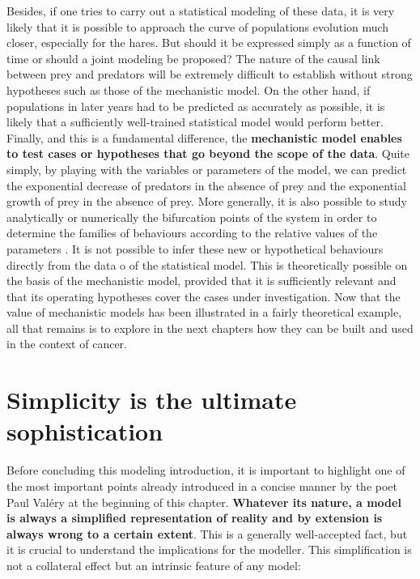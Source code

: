 \documentclass[a4paper,12pt,twoside,onecolumn,openright,final,oldfontcommands]{memoir}
\begin{document}
Besides, if one tries to carry out a statistical modeling of these data,
it is very likely that it is possible to approach the curve of
populations evolution much closer, especially for the hares. But should
it be expressed simply as a function of time or should a joint modeling
be proposed? The nature of the causal link between prey and predators
will be extremely difficult to establish without strong hypotheses such
as those of the mechanistic model. On the other hand, if populations in
later years had to be predicted as accurately as possible, it is likely
that a sufficiently well-trained statistical model would perform better.
Finally, and this is a fundamental difference, the \textbf{mechanistic
model enables to test cases or hypotheses that go beyond the scope of
the data}. Quite simply, by playing with the variables or parameters of
the model, we can predict the exponential decrease of predators in the
absence of prey and the exponential growth of prey in the absence of
prey. More generally, it is also possible to study analytically or
numerically the bifurcation points of the system in order to determine
the families of behaviours according to the relative values of the
parameters \citep{flake1998computational}. It is not possible to infer
these new or hypothetical behaviours directly from the data o of the
statistical model. This is theoretically possible on the basis of the
mechanistic model, provided that it is sufficiently relevant and that
its operating hypotheses cover the cases under investigation. Now that
the value of mechanistic models has been illustrated in a fairly
theoretical example, all that remains is to explore in the next chapters
how they can be built and used in the context of cancer.

\section{Simplicity is the ultimate
sophistication}\label{simplicity-is-the-ultimate-sophistication}

Before concluding this modeling introduction, it is important to
highlight one of the most important points already introduced in a
concise manner by the poet Paul Valéry at the beginning of this chapter.
\textbf{Whatever its nature, a model is always a simplified
representation of reality and by extension is always wrong to a certain
extent}. This is a generally well-accepted fact, but it is crucial to
understand the implications for the modeller. This simplification is not
a collateral effect but an intrinsic feature of any model:
\end{document}
